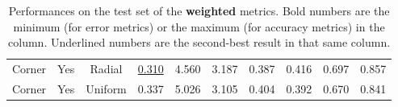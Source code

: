 \begin{table}
\begin{adjustwidth}{-0.2\textwidth}{-0.2\textwidth}
\begin{tabular}{c|c|c|c|c|c|c|c|c|c}
        Corner & Yes & Radial  &  \underline{0.310} &            4.560  &            3.187  &            0.387  &            0.416  &            0.697  &            0.857  \\
        Corner & Yes & Uniform &             0.337  &            5.026  &            3.105  &            0.404  &            0.392  &            0.670  &            0.841  \\
    \end{tabular}
    \end{adjustwidth}
    \caption{
        Performances on the test set of the \textbf{weighted} metrics.
        Bold numbers are the minimum (for error metrics) or the maximum (for accuracy metrics) in the column.
        Underlined numbers are the second-best result in that same column.
        \label{t:weighted_results}
    }
\end{table}